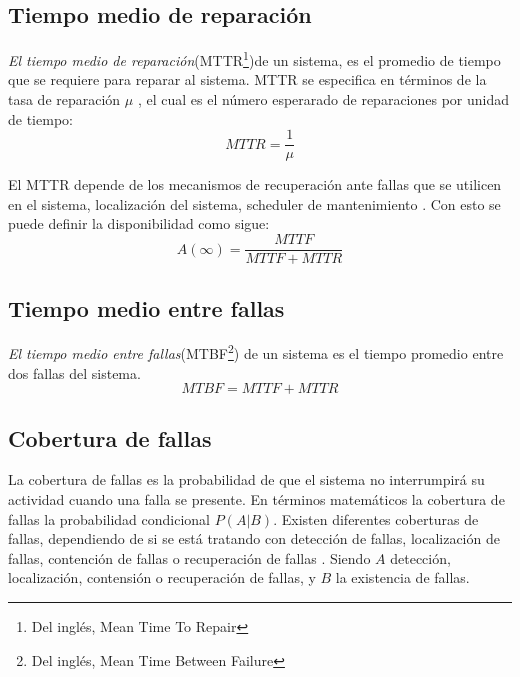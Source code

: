 \subsection{Tiempo medio de reparación}
\textit{El tiempo medio de reparación}(MTTR\footnote{Del inglés, Mean Time To Repair})de un sistema, es el promedio de tiempo que se requiere para reparar al sistema.
MTTR se especifica en términos de la tasa de reparación $\mu$ \cite{FTDesign}, el cual es el número esperarado de reparaciones por unidad de tiempo: $$MTTR = \frac{1}{\mu}$$

El MTTR depende de los mecanismos de recuperación ante fallas que se utilicen en el sistema, localización del sistema, scheduler de mantenimiento \cite{FTDesign}.
Con esto se puede definir la disponibilidad como sigue: $$A(\infty) = \frac{MTTF}{MTTF+MTTR}$$

\subsection{Tiempo medio entre fallas}
\textit{El tiempo medio entre fallas}(MTBF\footnote{Del inglés, Mean Time Between Failure}) de un sistema es el tiempo promedio entre dos fallas del sistema. $$MTBF = MTTF + MTTR$$

\subsection{Cobertura de fallas}
La cobertura de fallas es la probabilidad  de que el sistema no interrumpirá su actividad cuando una falla se presente. En términos matemáticos la cobertura
de fallas la probabilidad condicional $P(A|B)$. Existen diferentes coberturas de fallas, dependiendo de si se está tratando con detección de fallas, localización de fallas, contención de
fallas o recuperación de fallas \cite{FTDesign}. Siendo $A$ detección, localización, contensión o recuperación de fallas, y $B$ la existencia de fallas.
